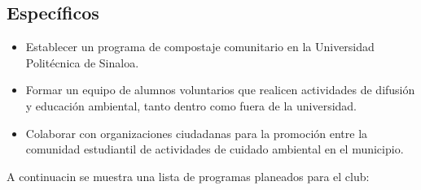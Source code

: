 \subsection{Específicos}

\begin{itemize}
    \item Establecer un programa de compostaje comunitario en la Universidad Politécnica de Sinaloa. 
    \item Formar un equipo de alumnos voluntarios que realicen actividades de difusión y educación ambiental, tanto dentro como fuera de la universidad. 
    \item Colaborar con organizaciones ciudadanas para la promoción entre la comunidad estudiantil de actividades de cuidado ambiental en el municipio. 
\end{itemize}

A continuacin se muestra una lista de programas planeados para el club:

    

